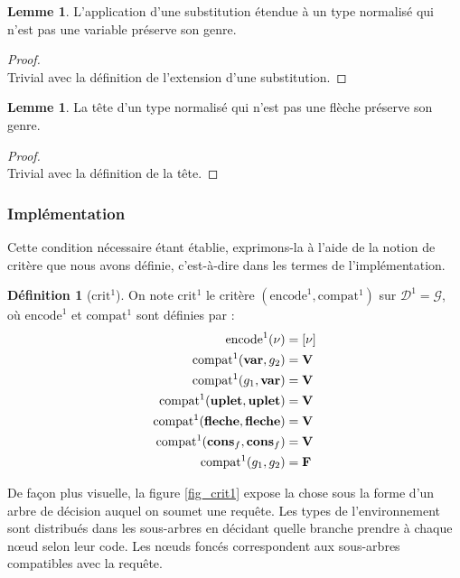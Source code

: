 \documentclass[a4paper]{report}
\newenvironment{preuve} 
  {\begin{proof}~\\} 
  {\end{proof}}
\theoremstyle{definition}
\newtheorem{definition}[theoreme]{Définition}
\newtheorem{lemme}[theoreme]{Lemme}
\newcommand{\G}{\mathscr{G}}
\begin{document}
\begin{lemme} \label{non_var_implique_subst_preserve_genre}
  L'application d'une substitution étendue à un type normalisé qui n'est pas une variable préserve son genre.
\end{lemme}

\begin{preuve}
  Trivial avec la définition de l'extension d'une substitution.
\end{preuve}

\begin{lemme} \label{non_fleche_implique_tete_preserve_genre}
  La tête d'un type normalisé qui n'est pas une flèche préserve son genre.
\end{lemme}

\begin{preuve}
  Trivial avec la définition de la tête.
\end{preuve}

\subsubsection{Implémentation}

Cette condition nécessaire étant établie, exprimons-la à l'aide de la notion de critère que nous avons définie, c'est-à-dire dans les termes de l'implémentation.

\begin{definition}[$\mathrm{crit}^1$]
  On note $\mathrm{crit}^1$ le critère $(\mathrm{encode}^1, \mathrm{compat}^1)$ sur $\mathscr{D}^1 = \G$, où $\mathrm{encode}^1$ et $\mathrm{compat}^1$ sont définies par :
  \begin{align*}
      \mathrm{encode}^1 (\nu) &=
      [ \nu ]
    \\
      \mathrm{compat}^1 (\bold{var}, {g}_2) &=
      \bold{V}
    \\
      \mathrm{compat}^1 ({g}_1, \bold{var}) &=
      \bold{V}
    \\
      \mathrm{compat}^1 (\bold{uplet}, \bold{uplet}) &=
      \bold{V}
    \\
      \mathrm{compat}^1 (\bold{fleche}, \bold{fleche}) &=
      \bold{V}
    \\
      \mathrm{compat}^1 (\bold{cons}_f, \bold{cons}_f) &=
      \bold{V}
    \\
      \mathrm{compat}^1 ({g}_1, {g}_2) &=
      \bold{F}
  \end{align*}
\end{definition}

De façon plus visuelle, la figure \ref{fig_crit1} expose la chose sous la forme d'un arbre de décision auquel on soumet une requête. Les types de l'environnement sont distribués dans les sous-arbres en décidant quelle branche prendre à chaque nœud selon leur code. Les nœuds foncés correspondent aux sous-arbres compatibles avec la requête.
\end{document}
